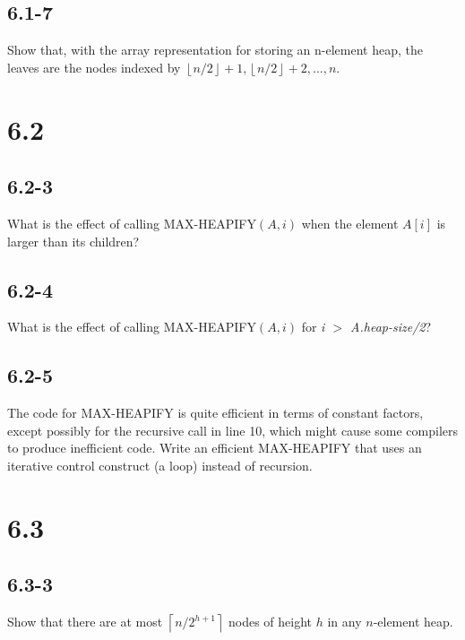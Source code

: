 \documentclass[11pt]{article}
\def\lc{\left\lceil}
\def\rc{\right\rceil}
\def\lf{\left\lfloor}
\def\rf{\right\rfloor}
\begin{document}
 \subsection*{6.1-7}
  Show that, with the array representation for storing an n-element heap, the leaves are 
  the nodes indexed by $\lf n/2 \rf + 1, \lf n/2 \rf + 2, ..., n$.

 \section*{6.2}
 \subsection*{6.2-3}
  What is the effect of calling MAX-HEAPIFY$(A,i)$ when the element $A[i]$ is larger than its 
  children?
 \subsection*{6.2-4}
  What is the effect of calling MAX-HEAPIFY$(A,i)$ for \textit{i $>$ A.heap-size/2}?
 \subsection*{6.2-5}
  The code for MAX-HEAPIFY is quite efficient in terms of constant factors, except possibly 
  for the recursive call in line 10, which might cause some compilers to produce inefficient 
  code. Write an efficient MAX-HEAPIFY that uses an iterative control construct (a loop) 
  instead of recursion.

 \section*{6.3}
 \subsection*{6.3-3}
 Show that there are at most $\lc n/2^{h+1} \rc$ nodes of height $h$ in any $n$-element heap.
 
\end{document}
